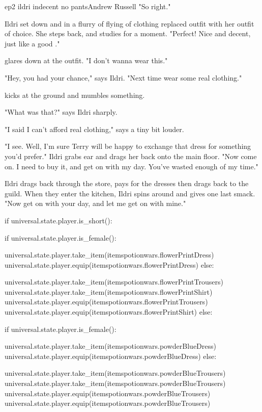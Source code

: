 \documentclass{book}
\begin{document}
\begin{childnode}{ep2 ildri indecent no pants}{Andrew Russell}
"So right."    

Ildri set \name{} down and in a flurry of flying of clothing replaced \names{} outfit with her outfit of choice. She steps back, and studies \name{} for a moment. "Perfect! Nice and decent, just
like a good \boygirl{}."

\name{} glares down at the outfit. "I don't wanna wear this."

"Hey, you had your chance," says Ildri. "Next time wear some real clothing."

\name{} kicks at the ground and mumbles something.

"What was that?" says Ildri sharply.

"I said I can't afford real clothing," says \name{} a tiny bit louder.

"I see. Well, I'm sure Terry will be happy to exchange that dress for something you'd prefer." Ildri grabs \names{} ear and drags her back onto the main floor. "Now come on. I need to buy it, and
get on with my day. You've wasted enough of my time."

Ildri drags \name{} back through the store, pays for the dresses then drags \name{} back to the guild. When they enter the kitchen, Ildri spins \name{} around and gives \name{} one last smack. 
"Now get on with your day, and let me get on with mine."

\begin{code}

    if universal.state.player.is_short():

        if universal.state.player.is_female():

            universal.state.player.take_item(itemspotionwars.flowerPrintDress)
            universal.state.player.equip(itemspotionwars.flowerPrintDress)
        else: 

            universal.state.player.take_item(itemspotionwars.flowerPrintTrousers)
            universal.state.player.take_item(itemspotionwars.flowerPrintShirt)
            universal.state.player.equip(itemspotionwars.flowerPrintTrousers)
            universal.state.player.equip(itemspotionwars.flowerPrintShirt)
    else:

        if universal.state.player.is_female():

            universal.state.player.take_item(itemspotionwars.powderBlueDress)
            universal.state.player.equip(itemspotionwars.powderBlueDress)
        else: 

            universal.state.player.take_item(itemspotionwars.powderBlueTrousers)
            universal.state.player.take_item(itemspotionwars.powderBlueTrousers)
            universal.state.player.equip(itemspotionwars.powderBlueTrousers)
            universal.state.player.equip(itemspotionwars.powderBlueTrousers)

\end{code}

\end{childnode}
\end{document}
